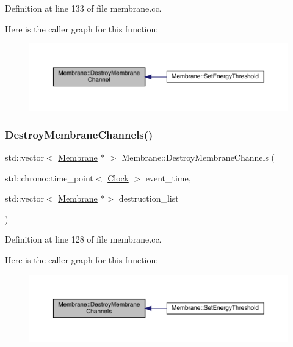 Definition at line 133 of file membrane.\+cc.

Here is the caller graph for this function\+:
\nopagebreak
\begin{figure}[H]
\begin{center}
\leavevmode
\includegraphics[width=350pt]{class_membrane_a12413d933a62b3bbb7931c6ab25de7de_icgraph}
\end{center}
\end{figure}
\mbox{\label{class_membrane_aea71c4443f2fc22359ac3f770ff7755e}} 
\subsubsection{\texorpdfstring{Destroy\+Membrane\+Channels()}{DestroyMembraneChannels()}}
{\footnotesize\ttfamily std\+::vector$<$ \hyperlink{class_membrane}{Membrane} $\ast$ $>$ Membrane\+::\+Destroy\+Membrane\+Channels (\begin{DoxyParamCaption}\item[{std\+::chrono\+::time\+\_\+point$<$ \hyperlink{universe_8h_a0ef8d951d1ca5ab3cfaf7ab4c7a6fd80}{Clock} $>$}]{event\+\_\+time,  }\item[{std\+::vector$<$ \hyperlink{class_membrane}{Membrane} $\ast$$>$}]{destruction\+\_\+list }\end{DoxyParamCaption})}



Definition at line 128 of file membrane.\+cc.

Here is the caller graph for this function\+:
\nopagebreak
\begin{figure}[H]
\begin{center}
\leavevmode
\includegraphics[width=350pt]{class_membrane_aea71c4443f2fc22359ac3f770ff7755e_icgraph}
\end{center}
\end{figure}
\mbox{\label{class_membrane_a85f8b2633ff32f79b6fbb466ce690858}} 
